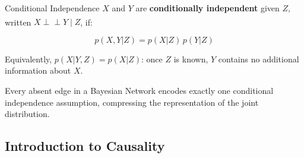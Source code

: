 \begin{v3topic}{Conditional Independence}
    $X$ and $Y$ are \textbf{conditionally independent} given $Z$, written
    $X \perp\!\!\!\perp Y \mid Z$,
    if:\textsuperscript{\cite[][p.~8]{barberBayesianReasoningMachine2012}}

    \begin{equation}
        p(X, Y | Z) = p(X|Z)\,p(Y|Z)
    \end{equation}

    Equivalently, $p(X|Y,Z) = p(X|Z)$: once $Z$ is known, $Y$ contains no
    additional information about $X$.

    Every absent edge in a Bayesian Network encodes exactly one conditional
    independence assumption, compressing the representation of the joint
    distribution.

\end{v3topic}

    \subsection{Introduction to Causality}

